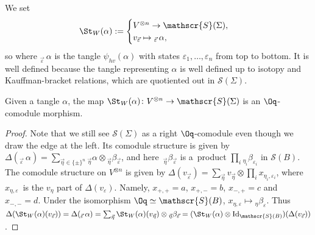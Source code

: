 \begin{Definition}
We set
\[
\St_W(\alpha) := \begin{cases}
V^{\otimes n} \to \mathscr{S}(\Sigma),
\\
v_{\vec{\varepsilon}} \mapsto {}_{\vec{\varepsilon}}\,\alpha,
\end{cases}
\]
so where ${}_{\vec{\varepsilon}}\,\alpha$ is the tangle $\psi_{hv}(\alpha)$ with states $\varepsilon_1,\dots,\varepsilon_n$ from top to bottom. It is well defined because the tangle representing $\alpha$ is well defined up to isotopy and Kauffman-bracket relations, which are quotiented out in $\mathscr{S}(\Sigma)$.
\end{Definition}

\begin{Proposition}\label{propStOqmorph}
Given a tangle $\alpha$, the map $\St_W(\alpha)\colon V^{\otimes n}\to\mathscr{S}(\Sigma)$ is an $\Oq$-comodule morphism.
\end{Proposition}
\begin{proof}
Note that we still see $\mathscr{S}(\Sigma)$ as a right $\Oq$-comodule even though we draw the edge at the left. Its comodule structure is given by $\Delta(_{\vec{\varepsilon}}\,\alpha) = \sum_{\vec{\eta} \in \{\pm\}^n} {}_{\vec{\eta}}\alpha \otimes {}_{\vec{\eta}}\beta_{\vec{\varepsilon}}$, and here~${}_{\vec{\eta}}\beta_{\vec{\varepsilon}}$ is a~product $\prod_i {}_{\eta_i}\beta_{\varepsilon_i}$ in $\mathscr{S}(B)$. The comodule structure on $V^{\otimes n}$ is given by $\Delta(v_{\vec{\varepsilon}}) = \sum_{\vec{\eta}} v_{\vec{\eta}} \otimes \prod_i x_{\eta_i,\varepsilon_i}$, where $x_{\eta,\varepsilon}$~is the $v_\eta$ part of $\Delta(v_\varepsilon)$. Namely, $x_{+,+} = a$, $x_{+,-}=b$, $x_{-,+}=c$ and $x_{-,-}=d$. Under the isomorphism $\Oq \simeq \mathscr{S}(B)$, $x_{\eta,\varepsilon}\mapsto {}_\eta\beta_{\varepsilon}$.
 Thus $\Delta(\St_W(\alpha)(v_{\vec{\varepsilon}})) = \Delta(_{\vec{\varepsilon}}\,\alpha) = \sum_{\vec{\eta}} \St_W(\alpha)(v_{\vec{\eta}}) \otimes {}_{\vec{\eta}}\beta_{\vec{\varepsilon}} = (\St_W(\alpha)\otimes {\rm Id}_{\mathscr{S}(B)})(\Delta(v_{\vec{\varepsilon}}))$.
\end{proof}

